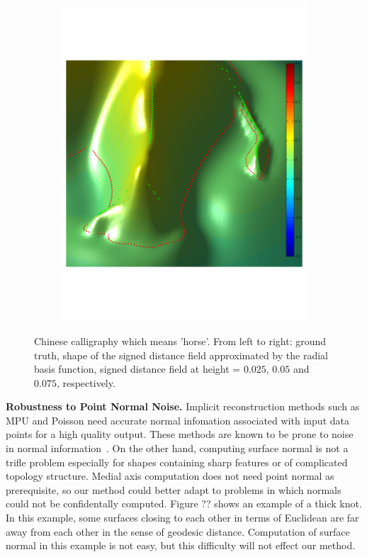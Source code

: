 \documentclass[review]{acmsiggraph}
\begin{document}
\begin{figure}
\begin{subfigure}[b]{0.3\linewidth}
                \includegraphics[width=\textwidth]{images/rhenoceros/3.pdf}
        \end{subfigure}
        \caption{Chinese calligraphy which means 'horse'. From left to right: ground truth, shape of the signed distance field approximated by the radial basis function, signed distance field at height = $0.025$, $0.05$ and $0.075$, respectively. }
				\label{fig:horse}
\end{figure}


\textbf{Robustness to Point Normal Noise. }
Implicit reconstruction methods such as MPU and Poisson need accurate normal infomation associated with input data points for a high quality output. These methods are known to be prone to noise in normal information~\cite{Wang-etal-2011}. On the other hand, computing surface normal is not a trifle problem especially for shapes containing sharp features or of complicated topology structure. Medial axis computation does not need point normal as prerequisite, so our method could better adapt to problems in which normals could not be confidentally computed. Figure ?? shows an example of a thick knot. In this example, some surfaces closing to each other in terms of Euclidean are far away from each other in the sense of geodesic distance. Computation of surface normal in this example is not easy, but this difficulty will not effect our method.
\end{document}
